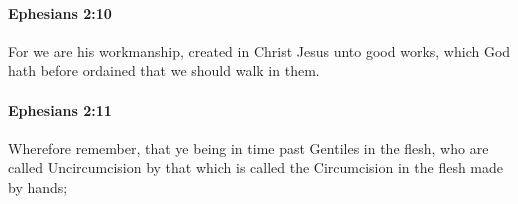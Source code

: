 		\paragraph{Ephesians 2:10} %
			\label{EPHESIANS-2-10}

			For we are his workmanship, created in Christ Jesus unto good works, which God hath before ordained that we should walk in them.

			\begin{framed}
			\scriptsize
				\begin{compactdesc}
					\item[SBLG] 
				\end{compactdesc}
			\end{framed}

		\paragraph{Ephesians 2:11} %
			\label{EPHESIANS-2-11}

			Wherefore remember, that ye being in time past Gentiles in the flesh, who are called Uncircumcision by that which is called the Circumcision in the flesh made by hands;

